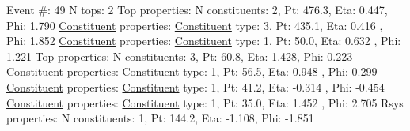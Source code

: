 \begin{DoxyCode}
Event #: 49
      N tops: 2
      Top properties: N constituents:   2,   Pt:  476.3,   Eta:   0.447,   Phi:   1.790
          \hyperlink{classConstituent}{Constituent} properties: \hyperlink{classConstituent}{Constituent} type:   3,   Pt:  435.1,   Eta:   0.416
      ,   Phi:   1.852
          \hyperlink{classConstituent}{Constituent} properties: \hyperlink{classConstituent}{Constituent} type:   1,   Pt:   50.0,   Eta:   0.632
      ,   Phi:   1.221
      Top properties: N constituents:   3,   Pt:   60.8,   Eta:   1.428,   Phi:   0.223
          \hyperlink{classConstituent}{Constituent} properties: \hyperlink{classConstituent}{Constituent} type:   1,   Pt:   56.5,   Eta:   0.948
      ,   Phi:   0.299
          \hyperlink{classConstituent}{Constituent} properties: \hyperlink{classConstituent}{Constituent} type:   1,   Pt:   41.2,   Eta:  -0.314
      ,   Phi:  -0.454
          \hyperlink{classConstituent}{Constituent} properties: \hyperlink{classConstituent}{Constituent} type:   1,   Pt:   35.0,   Eta:   1.452
      ,   Phi:   2.705
      Rsys properties: N constituents:   1,   Pt:  144.2,   Eta:  -1.108,   Phi:  -1.851
\end{DoxyCode}
 
